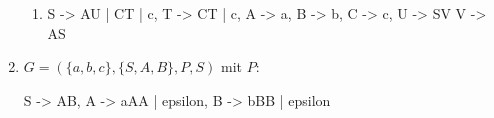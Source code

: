 \documentclass{lehramt-informatik-aufgabe}
\begin{document}
\begin{enumerate}
\begin{liAntwort}
\begin{enumerate}
\item {}

\begin{liProduktionsRegeln}
S -> AU | CT | c,
T -> CT | c,
A -> a,
B -> b,
C -> c,
U -> SV
V -> AS
\end{liProduktionsRegeln}

\end{enumerate}
\end{liAntwort}

%

\item $G = (\{a, b, c\}, \{S, A, B\}, P, S)$ mit $P$:

\begin{liProduktionsRegeln}
S -> AB,
A -> aAA | epsilon,
B -> bBB | epsilon
\end{liProduktionsRegeln}
\end{enumerate}
\end{document}
